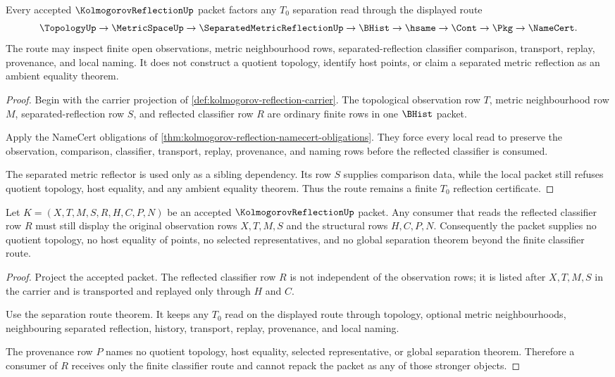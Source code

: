 \begin{theorem}
\label{thm:kolmogorov-reflection-separation-route}
Every accepted $\KolmogorovReflectionUp$ packet factors any $T_0$ separation read through the displayed route
$$
\TopologyUp\to\MetricSpaceUp\to\SeparatedMetricReflectionUp\to\BHist\to\hsame\to\Cont\to\Pkg\to\NameCert .
$$
The route may inspect finite open observations, metric neighbourhood rows, separated-reflection classifier comparison, transport, replay, provenance, and local naming. It does not construct a quotient topology, identify host points, or claim a separated metric reflection as an ambient equality theorem.
\end{theorem}
\begin{proof}
Begin with the carrier projection of \autoref{def:kolmogorov-reflection-carrier}. The topological observation row $T$, metric neighbourhood row $M$, separated-reflection row $S$, and reflected classifier row $R$ are ordinary finite rows in one $\BHist$ packet.

Apply the NameCert obligations of \autoref{thm:kolmogorov-reflection-namecert-obligations}. They force every local read to preserve the observation, comparison, classifier, transport, replay, provenance, and naming rows before the reflected classifier is consumed.

The separated metric reflector is used only as a sibling dependency. Its row $S$ supplies comparison data, while the local packet still refuses quotient topology, host equality, and any ambient equality theorem. Thus the route remains a finite $T_0$ reflection certificate.
\end{proof}

\begin{theorem}
\label{thm:kolmogorov-reflection-no-quotient-boundary}
Let $K=(X,T,M,S,R,H,C,P,N)$ be an accepted $\KolmogorovReflectionUp$ packet. Any consumer that reads the reflected classifier row $R$ must still display the original observation rows $X,T,M,S$ and the structural rows $H,C,P,N$. Consequently the packet supplies no quotient topology, no host equality of points, no selected representatives, and no global separation theorem beyond the finite classifier route.
\end{theorem}
\begin{proof}
Project the accepted packet. The reflected classifier row $R$ is not independent of the observation rows; it is listed after $X,T,M,S$ in the carrier and is transported and replayed only through $H$ and $C$.

Use the separation route theorem. It keeps any $T_0$ read on the displayed route through topology, optional metric neighbourhoods, neighbouring separated reflection, history, transport, replay, provenance, and local naming.

The provenance row $P$ names no quotient topology, host equality, selected representative, or global separation theorem. Therefore a consumer of $R$ receives only the finite classifier route and cannot repack the packet as any of those stronger objects.
\end{proof}

